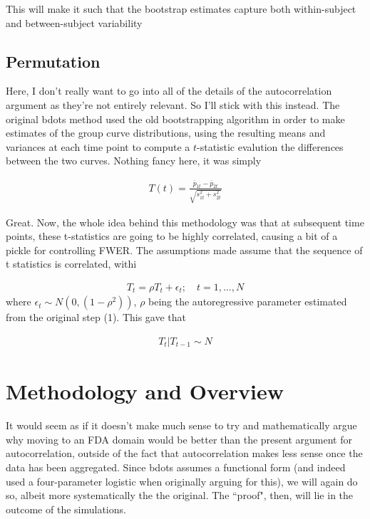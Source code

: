 \documentclass{article}
\begin{document}
This will make it such that the bootstrap estimates capture both within-subject and between-subject variability

\subsection{Permutation}

Here, I don't really want to go into all of the details of the autocorrelation argument as they're not entirely relevant. So I'll stick with this instead. The original bdots method used the old bootstrapping algorithm in order to make estimates of the group curve distributions, using the resulting means and variances at each time point to compute a $t$-statistic evalution the differences between the two curves. Nothing fancy here, it was simply

\begin{align*}
T(t) = \frac{\overline{p}_{1t} - \overline{p}_{2t}}{\sqrt{s_{1t}^2 + s_{2t}^2}}
\end{align*}

Great. Now, the whole idea behind this methodology was that at subsequent time points, these t-statistics are going to be highly correlated, causing a bit of a pickle for controlling FWER. The assumptions made assume that the sequence of t statistics is correlated, withi 

\begin{align*}
T_t = \rho T_t + \epsilon_t; \quad t = 1, \dots, N
\end{align*}
where $\epsilon_t \sim N(0, (1 - \rho^2))$, $\rho$ being the autoregressive parameter estimated from the original step (1). This gave that

\begin{align*}
T_t | T_{t-1} \sim N
\end{align*}

\section{Methodology and Overview} 



It would seem as if it doesn't make much sense to try and mathematically argue why moving to an FDA domain would be better than the present argument for autocorrelation, outside of the fact that autocorrelation makes less sense once the data has been aggregated. Since bdots assumes a functional form (and indeed used a four-parameter logistic when originally arguing for this), we will again do so, albeit more systematically the the original. The ``proof", then, will lie in the outcome of the simulations.
\end{document}
